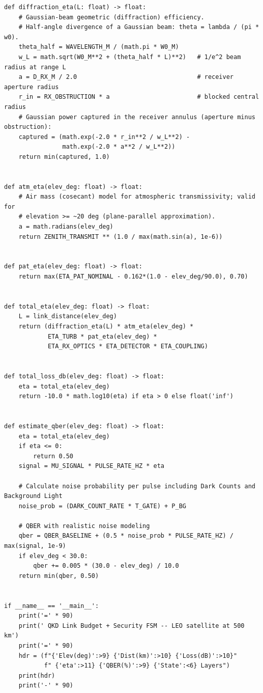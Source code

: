 \documentclass[a4paper,14pt]{extreport}
\begin{document}
\begin{latin}
\begin{verbatim}
def diffraction_eta(L: float) -> float:
    # Gaussian-beam geometric (diffraction) efficiency.
    # Half-angle divergence of a Gaussian beam: theta = lambda / (pi * w0).
    theta_half = WAVELENGTH_M / (math.pi * W0_M)
    w_L = math.sqrt(W0_M**2 + (theta_half * L)**2)   # 1/e^2 beam radius at range L
    a = D_RX_M / 2.0                                 # receiver aperture radius
    r_in = RX_OBSTRUCTION * a                        # blocked central radius
    # Gaussian power captured in the receiver annulus (aperture minus obstruction):
    captured = (math.exp(-2.0 * r_in**2 / w_L**2) -
                math.exp(-2.0 * a**2 / w_L**2))
    return min(captured, 1.0)


def atm_eta(elev_deg: float) -> float:
    # Air mass (cosecant) model for atmospheric transmissivity; valid for
    # elevation >= ~20 deg (plane-parallel approximation).
    a = math.radians(elev_deg)
    return ZENITH_TRANSMIT ** (1.0 / max(math.sin(a), 1e-6))


def pat_eta(elev_deg: float) -> float:
    return max(ETA_PAT_NOMINAL - 0.162*(1.0 - elev_deg/90.0), 0.70)


def total_eta(elev_deg: float) -> float:
    L = link_distance(elev_deg)
    return (diffraction_eta(L) * atm_eta(elev_deg) *
            ETA_TURB * pat_eta(elev_deg) *
            ETA_RX_OPTICS * ETA_DETECTOR * ETA_COUPLING)


def total_loss_db(elev_deg: float) -> float:
    eta = total_eta(elev_deg)
    return -10.0 * math.log10(eta) if eta > 0 else float('inf')


def estimate_qber(elev_deg: float) -> float:
    eta = total_eta(elev_deg)
    if eta <= 0:
        return 0.50
    signal = MU_SIGNAL * PULSE_RATE_HZ * eta
    
    # Calculate noise probability per pulse including Dark Counts and Background Light
    noise_prob = (DARK_COUNT_RATE * T_GATE) + P_BG
    
    # QBER with realistic noise modeling
    qber = QBER_BASELINE + (0.5 * noise_prob * PULSE_RATE_HZ) / max(signal, 1e-9)
    if elev_deg < 30.0:
        qber += 0.005 * (30.0 - elev_deg) / 10.0
    return min(qber, 0.50)


if __name__ == '__main__':
    print('=' * 90)
    print(' QKD Link Budget + Security FSM -- LEO satellite at 500 km')
    print('=' * 90)
    hdr = (f"{'Elev(deg)':>9} {'Dist(km)':>10} {'Loss(dB)':>10}"
           f" {'eta':>11} {'QBER(%)':>9} {'State':<6} Layers")
    print(hdr)
    print('-' * 90)


\end{verbatim}
\end{latin}
\end{document}
